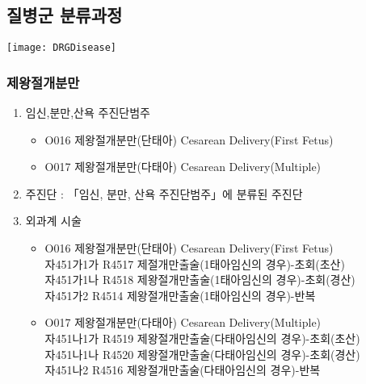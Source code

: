 \subsection{질병군 분류과정}
\texttt{[image: DRGDisease]}
\subsubsection{제왕절개분만}
\begin{enumerate}[가.]\tightlist
\item 임신,분만,산욕 주진단범주
	\begin{itemize}\tightlist
	\item O016 제왕절개분만(단태아) Cesarean Delivery(First Fetus)
	\item O017 제왕절개분만(다태아) Cesarean Delivery(Multiple)
	\end{itemize}
\item 주진단 : 「임신, 분만, 산욕 주진단범주」에 분류된 주진단
	
\item 외과계 시술
	\begin{itemize}\tightlist
	\item O016 제왕절개분만(단태아) Cesarean Delivery(First Fetus)\\
	 자451가1가 R4517 제절개만출술(1태아임신의 경우)-초회(초산)\\
	 자451가1나 R4518 제왕절개만출술(1태아임신의 경우)-초회(경산)\\
	 자451가2 R4514 제왕절개만출술(1태아임신의 경우)-반복
	\item O017 제왕절개분만(다태아) Cesarean Delivery(Multiple)\\
	 자451나1가 R4519 제왕절개만출술(다태아임신의 경우)-초회(초산)\\
	 자451나1나 R4520 제왕절개만출술(다태아임신의 경우)-초회(경산)\\
	 자451나2 R4516 제왕절개만출술(다태아임신의 경우)-반복
	\end{itemize}
\end{enumerate}

